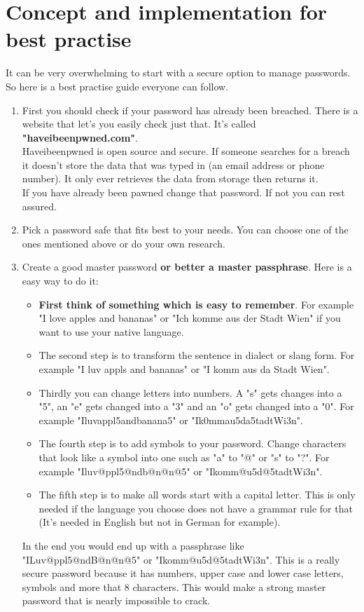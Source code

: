 \documentclass[conference]{IEEEtran}
\begin{document}
\section{Concept and implementation for best practise}
It can be very overwhelming to start with a secure option to manage passwords. So here is a best practise guide everyone can follow.
\begin{enumerate}
\item First you should check if your password has already been breached. There is a website that let's you easily check just that. It's called \textbf{"haveibeenpwned.com"}.\\
Haveibeenpwned is open source and secure. If someone searches for a breach it doesn't store the data that was typed in (an email address or phone number). It only ever retrieves the data from storage then returns it.\\
If you have already been pawned change that password. If not you can rest assured.
\item Pick a password safe that fits best to your needs. You can choose one of the ones mentioned above or do your own research.
\item Create a good master password \textbf{or better a master passphrase}. Here is a easy way to do it: 
\begin{itemize}
\item \textbf{First think of something which is easy to remember}. For example "I love apples and bananas" or "Ich komme aus der Stadt Wien" if you want to use your native language.
\item The second step is to transform the sentence in dialect or slang form. For example "I luv appls and bananas" or "I komm aus da Stadt Wien".
\item Thirdly you can change letters into numbers. A "s" gets changes into a "5", an "e" gets changed into a "3" and an "o" gets changed into a "0". For example "Iluvappl5andbanana5" or "Ik0mmau5da5tadtWi3n".
\item The fourth step is to add symbols to your password. Change characters that look like a symbol into one such as "a" to "@" or "s" to "?". For example "Iluv@ppl5@ndb@n@n@5" or "Ikomm@u5d@5tadtWi3n".
\item The fifth step is to make all words start with a capital letter. This is only needed if the language you choose does not have a grammar rule for that (It's needed in English but not in German for example). 
\end{itemize}
In the end you would end up with a passphrase like "ILuv@ppl5@ndB@n@n@5" or "Ikomm@u5d@5tadtWi3n". This is a really secure password because it has numbers, upper case and lower case letters, symbols and more that 8 characters. This would make a strong master password that is nearly impossible to crack.
\end{enumerate}
\end{document}
